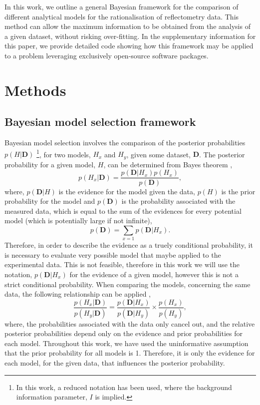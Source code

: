 \documentclass[
 reprint,
 superscriptaddress,
 amsmath,amssymb,
 aps,
]{revtex4-1}
\begin{document}
In this work, we outline a general Bayesian framework for the comparison of different analytical models for the rationalisation of reflectometry data. 
This method can allow the maximum information to be obtained from the analysis of a given dataset, without risking over-fitting.
In the supplementary information for this paper, we provide detailed code showing how this framework may be applied to a problem leveraging exclusively open-source software packages. 

\section{\label{methods} Methods}

\subsection{\label{bayes_mod} Bayesian model selection framework}

Bayesian model selection involves the comparison of the posterior probabilities $p(H|\mathbf{D})$ \footnote{In this work, a reduced notation has been used, where the background information parameter, $I$ is implied.}, for two models, $H_x$ and $H_y$, given some dataset, $\bm{D}$. 
The posterior probability for a given model, $H$, can be determined from Bayes theorem \cite{bayes_essay_1763}, 
%
\begin{equation}
    p(H_x|\bm{D}) = \frac{p(\bm{D}|H_x)p(H_x)}{p(\bm{D})},
\end{equation}
%
where, $p(\bm{D}|H)$ is the evidence for the model given the data, $p(H)$ is the prior probability for the model and $p(\bm{D})$ is the probability associated with the measured data, which is equal to the sum of the evidences for every potential model (which is potentially large if not infinite), 
%
\begin{equation}
    p(\bm{D}) = \sum_{x = 1}{p(\bm{D}|H_x)}.
\end{equation}
%
Therefore, in order to describe the evidence as a truely conditional probability, it is necessary to evaluate very possible model that maybe applied to the experimental data. 
This is not feasible, therefore in this work we will use the notation, $p(\bm{D}|H_x)$ for the evidence of a given model, however this is not a strict conditional probability. 
When comparing the models, concerning the same data, the following relationship can be applied \cite{pullen_bayesian_2014}, 
%
\begin{equation}
    \frac{p(H_x|\bm{D})}{p(H_y|\bm{D})} = \frac{p(\bm{D}|H_x)}{p(\bm{D}|H_y)} \times \frac{p(H_x)}{p(H_y)},
    \label{equ:ratio}
\end{equation}
%
where, the probabilities associated with the data only cancel out, and the relative posterior probabilities depend only on the evidence and prior probabilities for each model. 
Throughout this work, we have used the uninformative assumption that the prior probability for all models is \num{1}.
Therefore, it is only the evidence for each model, for the given data, that influences the posterior probability. 
\end{document}
